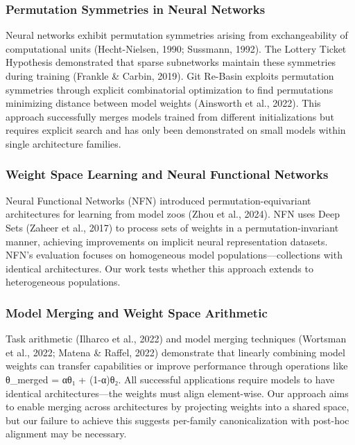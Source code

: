 
\subsubsection{Permutation Symmetries in Neural Networks}

Neural networks exhibit permutation symmetries arising from exchangeability of computational units (Hecht-Nielsen, 1990; Sussmann, 1992). The Lottery Ticket Hypothesis demonstrated that sparse subnetworks maintain these symmetries during training (Frankle \& Carbin, 2019). Git Re-Basin exploits permutation symmetries through explicit combinatorial optimization to find permutations minimizing distance between model weights (Ainsworth et al., 2022). This approach successfully merges models trained from different initializations but requires explicit search and has only been demonstrated on small models within single architecture families.

\subsubsection{Weight Space Learning and Neural Functional Networks}

Neural Functional Networks (NFN) introduced permutation-equivariant architectures for learning from model zoos (Zhou et al., 2024). NFN uses Deep Sets (Zaheer et al., 2017) to process sets of weights in a permutation-invariant manner, achieving improvements on implicit neural representation datasets. NFN's evaluation focuses on homogeneous model populations—collections with identical architectures. Our work tests whether this approach extends to heterogeneous populations.

\subsubsection{Model Merging and Weight Space Arithmetic}

Task arithmetic (Ilharco et al., 2022) and model merging techniques (Wortsman et al., 2022; Matena \& Raffel, 2022) demonstrate that linearly combining model weights can transfer capabilities or improve performance through operations like θ_merged = αθ₁ + (1-α)θ₂. All successful applications require models to have identical architectures—the weights must align element-wise. Our approach aims to enable merging across architectures by projecting weights into a shared space, but our failure to achieve this suggests per-family canonicalization with post-hoc alignment may be necessary.

